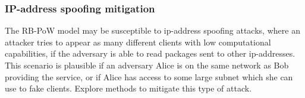 \subsubsection{IP-address spoofing mitigation}
The RB-PoW model may be susceptible to ip-address spoofing attacks, where an attacker tries to appear as many different clients with low computational capabilities, if the adversary is able to read packages sent to other ip-addresses.  This scenario is plausible if an adversary Alice is on the same network as Bob providing the service, or if Alice has access to some large subnet which she can use to fake clients. Explore methods to mitigate this type of attack. 


 


